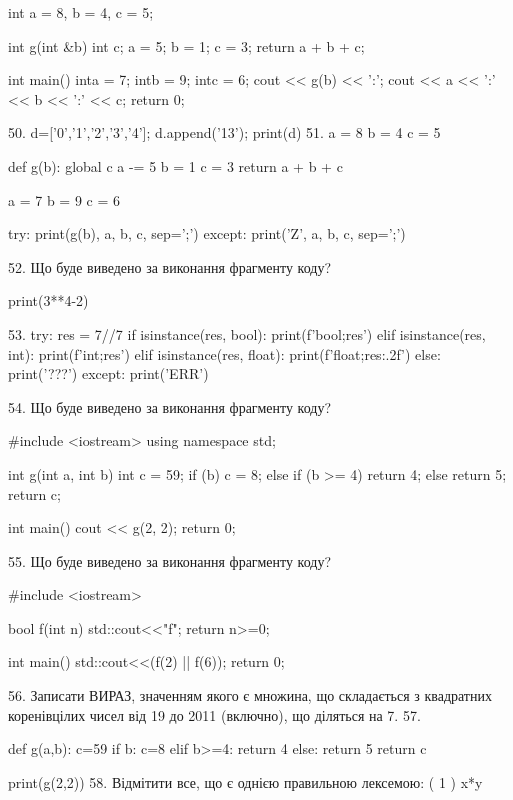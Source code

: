 \documentclass[11pt]{article}
\begin{document}
int a = 8, b = 4, c = 5;

int g(int &b){
int c;    a = 5;
    b = 1;
    c = 3;
    return a + b + c;
}

int main(){
    inta = 7;
    intb = 9;
    intc = 6;
    cout << g(b) << ':';
    cout << a << ':' << b << ':' << c;
    return 0; 
}

50. 
d=['0','1','2','3','4']; d.append('13'); print(d)
51. 
a = 8
b = 4
c = 5

def g(b):
global c    a -= 5
    b = 1
    c = 3
    return a + b + c

a = 7
b = 9
c = 6

try:
    print(g(b), a, b, c, sep=';')
except:
    print('Z', a, b, c, sep=';')

52. Що буде виведено за виконання фрагменту коду?

print(3**4-2)

53. 
try:
    res = 7//7%
    if isinstance(res, bool):
        print(f'bool;{res}')
    elif isinstance(res, int):
        print(f'int;{res}')
    elif isinstance(res, float):
        print(f'float;{res:.2f}')
    else:
        print('???')
except:
    print('ERR')

54. Що буде виведено за виконання фрагменту коду?

#include <iostream>
using namespace std;

int g(int a, int b){
    int c = 59;
    if (b)
        c = 8;
    else if (b >= 4)
         return 4;
    else 
        return 5;
    return c;
}

int main(){
    cout << g(2, 2);
    return 0;
}

55. Що буде виведено за виконання фрагменту коду?

#include <iostream>

bool f(int n){
    std::cout<<"f";
    return n>=0;
}

int main(){
    std::cout<<(f(2) || f(6));
    return 0;
}

56. 
Записати ВИРАЗ, значенням якого є множина, що складається з квадратних коренівцілих чисел від 19 до 2011 (включно), що діляться на 7.
57. 

def g(a,b):
    c=59
    if b:
        c=8
    elif b>=4:
         return 4
    else: 
        return 5
    return c

print(g(2,2))
58. %
Відмітити все, що є однією правильною лексемою:
( 1 ) x*y
\end{document}
